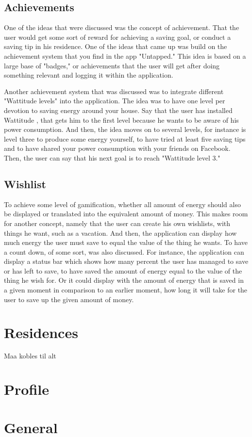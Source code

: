 \subsection{Achievements}
One of the ideas that were discussed was the concept of achievement. That the user would get some sort of reward for achieving a saving goal, or conduct a saving tip in his residence. One of the ideas that came up was build on the achievement system that you find in the app "Untapped." 
This idea is based on a large base of "badges," or achievements that the user will get after doing something relevant and logging it within the application. 

Another achievement system that was discussed was to integrate different "Wattitude levels" into the application. The idea was to have one level per devotion to saving energy around your house. Say that the user has installed Wattitude , that gets him to the first level because he wants to be aware of his power consumption. And then, the idea moves on to several levels, for instance is level three to produce some energy yourself, to have tried at least five saving tips and to have shared your power consumption with your friends on Facebook.  Then, the user can say that his next goal is to reach "Wattitude level 3." 

\subsection{Wishlist}
To achieve some level of gamification, whether all amount of energy should also be displayed or translated into the equivalent amount of money. This makes room for another concept, namely that the user can create his own wishlists, with things he want, such as a vacation. And then, the application can display how much energy the user must save to equal the value of the thing he wants. To have a count down, of some sort, was also discussed. For instance, the application can display a status bar  which shows how many percent the user has managed to save or has left to save, to have saved the amount of energy equal to the value of the thing he wish for. Or it could display with the amount of energy that is saved in a given moment in comparison to an earlier moment, how long it will take for the user to save up the given amount of money.  


\section{Residences}
Maa kobles til alt

\section{Profile}

\section{General}